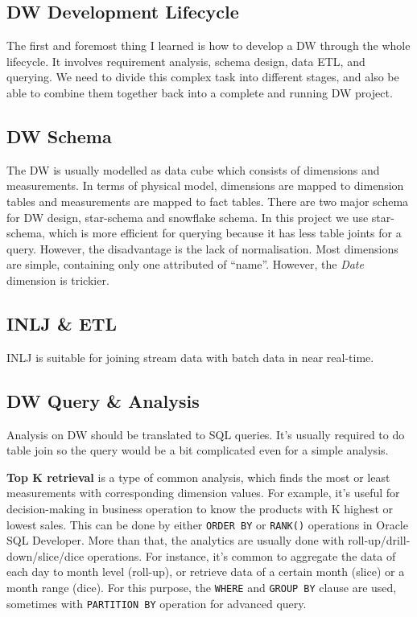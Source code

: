 \documentclass[
  a4paper,
]{article}
\begin{document}
\hypertarget{dw-development-lifecycle}{%
\subsection{DW Development Lifecycle}\label{dw-development-lifecycle}}

The first and foremost thing I learned is how to develop a DW through
the whole lifecycle. It involves requirement analysis, schema design,
data ETL, and querying. We need to divide this complex task into
different stages, and also be able to combine them together back into a
complete and running DW project.

\hypertarget{dw-schema}{%
\subsection{DW Schema}\label{dw-schema}}

The DW is usually modelled as data cube which consists of dimensions and
measurements. In terms of physical model, dimensions are mapped to
dimension tables and measurements are mapped to fact tables. There are
two major schema for DW design, star-schema and snowflake schema. In
this project we use star-schema, which is more efficient for querying
because it has less table joints for a query. However, the disadvantage
is the lack of normalisation. Most dimensions are simple, containing
only one attributed of ``name''. However, the \emph{Date} dimension is
trickier.

\hypertarget{inlj-etl}{%
\subsection{INLJ \& ETL}\label{inlj-etl}}

INLJ is suitable for joining stream data with batch data in near
real-time.

\hypertarget{dw-query-analysis}{%
\subsection{DW Query \& Analysis}\label{dw-query-analysis}}

Analysis on DW should be translated to SQL queries. It's usually
required to do table join so the query would be a bit complicated even
for a simple analysis.

\textbf{Top K retrieval} is a type of common analysis, which finds the
most or least measurements with corresponding dimension values. For
example, it's useful for decision-making in business operation to know
the products with K highest or lowest sales. This can be done by either
\texttt{ORDER\ BY} or \texttt{RANK()} operations in Oracle SQL
Developer. More than that, the analytics are usually done with
roll-up/drill-down/slice/dice operations. For instance, it's common to
aggregate the data of each day to month level (roll-up), or retrieve
data of a certain month (slice) or a month range (dice). For this
purpose, the \texttt{WHERE} and \texttt{GROUP\ BY} clause are used,
sometimes with \texttt{PARTITION\ BY} operation for advanced query.
\end{document}
